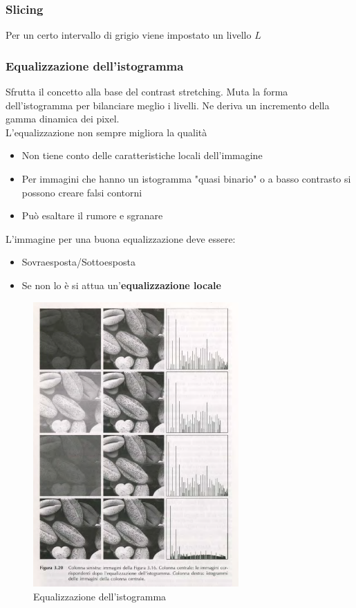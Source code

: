 \documentclass[12pt]{article}
\begin{document}
\subsubsection{Slicing}
Per un certo intervallo di grigio viene impostato un livello $L$
\subsubsection{Equalizzazione dell'istogramma}
Sfrutta il concetto alla base del contrast stretching. Muta la forma dell'istogramma per bilanciare meglio i livelli. Ne deriva un incremento della gamma dinamica dei pixel.\\ L'equalizzazione non sempre migliora la qualità
\begin{itemize}
    \item Non tiene conto delle caratteristiche locali dell'immagine
    \item Per immagini che hanno un istogramma "quasi binario" o a basso contrasto si possono creare falsi contorni
    \item Può esaltare il rumore e sgranare
\end{itemize}
L'immagine per una buona equalizzazione deve essere:
\begin{itemize}
    \item Sovraesposta/Sottoesposta
    \item Se non lo è si attua un'\textbf{equalizzazione locale}
\end{itemize}
\begin{figure}[!htb]
    \centering
    \includegraphics[width=0.7\textwidth]{Images/histeq.png}
    \caption{Equalizzazione dell'istogramma}
\end{figure}
\FloatBarrier
\end{document}
